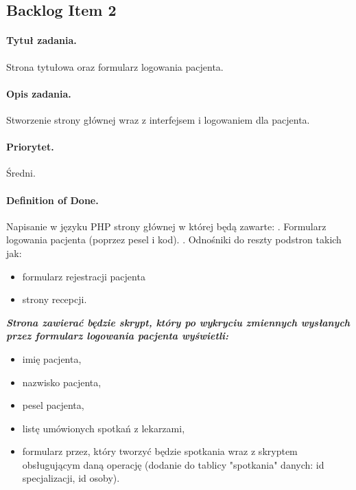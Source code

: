 \documentclass[a4paper]{article} \usepackage{polski} \usepackage[cp1250]{inputenc} \usepackage{url}
\begin{document}
\subsection{Backlog Item 2}\paragraph{Tytuł zadania.} Strona tytułowa oraz formularz logowania pacjenta. \paragraph{Opis zadania.} Stworzenie strony głównej wraz z interfejsem i logowaniem dla pacjenta. \paragraph{Priorytet.} Średni. \paragraph{Definition of Done.} Napisanie w języku PHP strony głównej w której będą zawarte:
\newline
{}. Formularz logowania pacjenta (poprzez pesel i kod).
\newline
{}. Odnośniki do reszty podstron takich jak:
\begin{itemize}
\item formularz rejestracji pacjenta
\item strony recepcji.
\end {itemize}

\textit{\textbf{Strona zawierać będzie skrypt, który po wykryciu zmiennych wysłanych przez formularz logowania pacjenta wyświetli:}}

\begin{itemize}
\item imię pacjenta, 
\item nazwisko pacjenta, 
\item pesel pacjenta, 
\item listę umówionych spotkań z lekarzami,
\item formularz przez, który tworzyć będzie spotkania wraz z skryptem obsługującym daną operację (dodanie do tablicy "spotkania" danych: id specjalizacji, id osoby).

\end{itemize}
\end{document}

